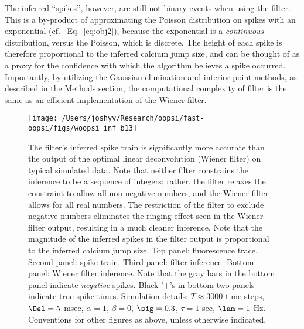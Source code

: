 The inferred ``spikes'', however, are still not binary events when using the \foopsi filter.  This is a by-product of approximating the Poisson distribution on spikes with an exponential (cf.~ Eq.~\eqref{eq:obj2}), because the exponential is a \emph{continuous} distribution, versus the Poisson, which is discrete.  The height of each spike is therefore proportional to the inferred calcium jump size, and can be thought of as a proxy for the confidence with which the algorithm believes a spike occurred.   Importantly, by utilizing the Gaussian elimination and interior-point methods, as described in the Methods section, the computational complexity of \foopsi filter is the same as an efficient implementation of the Wiener filter.  




\begin{figure}[h!]
\centering \texttt{[image: /Users/joshyv/Research/oopsi/fast-oopsi/figs/woopsi\_inf\_b13]}
\caption[\foopsi filter outperforms Wiener filter]{The \foopsi filter's inferred spike train is significantly more accurate than the output of the optimal linear deconvolution (Wiener filter) on typical simulated data. Note that neither filter constrains the inference to be a sequence of integers; rather, the \foopsi filter relaxes the constraint to allow all non-negative numbers, and the Wiener filter allows for all real numbers.  The restriction of the \foopsi filter to exclude negative numbers eliminates the ringing effect seen in the Wiener filter output, resulting in a much cleaner inference.  Note that the magnitude of the inferred spikes in the \foopsi filter output is proportional to the inferred calcium jump size.  Top panel: fluorescence trace.  Second panel: spike train.  Third panel: \foopsi filter inference.  Bottom panel: Wiener filter inference.  Note that the gray bars in the bottom panel indicate \emph{negative} spikes. Black '$+$'s in bottom two panels indicate true spike times.  Simulation details: $T\approx 3000$ time steps, $\Del=5$ msec, $\alpha=1$, $\beta=0$, $\sig=0.3$, $\tau=1$ sec, $\lam=1$ Hz. Conventions for other figures as above, unless otherwise indicated.} \label{fig:woopsi_inf}
\end{figure}

